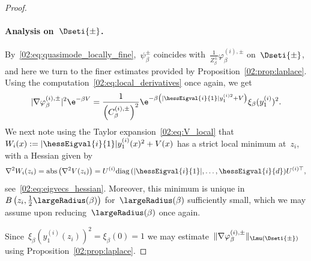 \begin{proof}
            \paragraph{Analysis on~$\Dseti{\pm}$.\newline}
            By~\eqref{02:eq:quasimode_locally_fine},~$\psi_\beta^\pm$ coincides with~$\frac1{Z_\beta^{\pm}}\varphi_\beta^{(i),\pm}$ on~$\Dseti{\pm}$, and here we turn to the finer estimates provided by Proposition~\ref{02:prop:laplace}.
            Using the computation~\eqref{02:eq:local_derivatives} once again, we get
            \[|\nabla\varphi_\beta^{(i),\pm}|^2\e^{-\beta V}= \frac1{\left(C_\beta^{(i),\pm}\right)^2}\e^{-\beta\left(|\hessEigval{i}{1}|y^{(i)2}_1+ V\right)}\xi_\beta(y_1^{(i)})^2.\]
            We next note using the Taylor expansion~\eqref{02:eq:V_local} that $W_i(x):=|\hessEigval{i}{1}|y^{(i)}_1(x)^2+ V(x)$ has a strict local minimum at~$z_i$, with a Hessian given by
            $${\nabla^2 W_i(z_i) = \mathrm{abs}\left(\nabla^2 V(z_i)\right) = U^{(i)}\mathrm{diag}\left(|\hessEigval{i}{1}|,\dots, \hessEigval{i}{d}\right)}U^{(i)\top},$$
            see~\eqref{02:eq:eigvecs_hessian}. Moreover, this minimum is unique in~$B\left(z_i,\frac12\largeRadius(\beta)\right)$ for~$\largeRadius(\beta)$ sufficiently small, which we may assume upon reducing~$\largeRadius(\beta)$ once again.

            Since~$\xi_\beta(y_1^{(i)}(z_i))^2=\xi_\beta(0)=1$ we may estimate~$\|\nabla \varphi_\beta^{(i),\pm}\|_{\Lmu(\Dseti{\pm})}$ using Proposition~\ref{02:prop:laplace}.


\end{proof}
